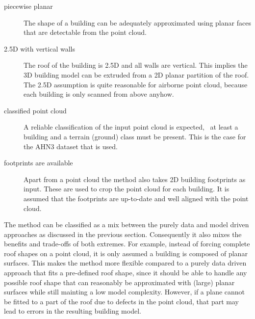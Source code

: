 \begin{description}
	\item[piecewise planar] The shape of a building can be adequately approximated using planar faces that are detectable from the point cloud.
	\item[2.5D with vertical walls] The roof of the building is 2.5D and all walls are vertical. This implies the 3D building model can be extruded from a 2D planar partition of the roof. The 2.5D assumption is quite reasonable for airborne point cloud, because each building is only scanned from above anyhow.
	\item[classified point cloud] A reliable classification of the input point cloud is expected, \ie\ at least a building and a terrain (ground) class must be present. This is the case for the AHN3 dataset that is used.
	\item[footprints are available] Apart from a point cloud the method also takes 2D building footprints as input. These are used to crop the point cloud for each building. It is assumed that the footprints are up-to-date and well aligned with the point cloud.
\end{description}

The method can be classified as a mix between the purely data and model driven approaches as discussed in the previous section. 
Consequently it also mixes the benefits and trade-offs of both extremes.
For example, instead of forcing complete roof shapes on a point cloud, it is only assumed a building is composed of planar surfaces.
This makes the method more flexible compared to a purely data driven approach that fits a pre-defined roof shape, since it should be able to handle any possible roof shape that can reasonably be approximated with (large) planar surfaces while still mainting a low model complexity.
However, if a plane cannot be fitted to a part of the roof due to defects in the point cloud, that part may lead to errors in the resulting building model.



